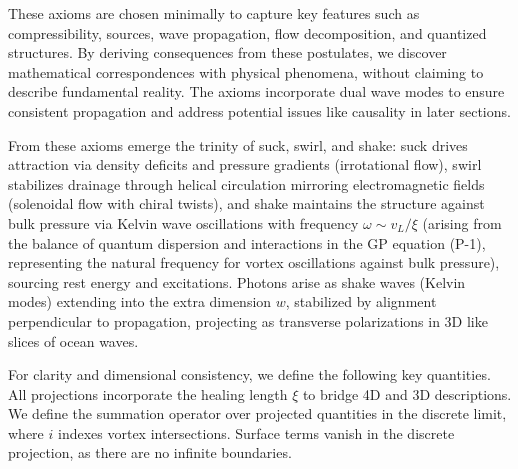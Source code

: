 These axioms are chosen minimally to capture key features such as compressibility, sources, wave propagation, flow decomposition, and quantized structures. By deriving consequences from these postulates, we discover mathematical correspondences with physical phenomena, without claiming to describe fundamental reality. The axioms incorporate dual wave modes to ensure consistent propagation and address potential issues like causality in later sections.

From these axioms emerge the trinity of suck, swirl, and shake: suck drives attraction via density deficits and pressure gradients (irrotational flow), swirl stabilizes drainage through helical circulation mirroring electromagnetic fields (solenoidal flow with chiral twists), and shake maintains the structure against bulk pressure via Kelvin wave oscillations with frequency $\omega \sim v_L / \xi$ (arising from the balance of quantum dispersion and interactions in the GP equation (P-1), representing the natural frequency for vortex oscillations against bulk pressure), sourcing rest energy and excitations. Photons arise as shake waves (Kelvin modes) extending into the extra dimension $w$, stabilized by alignment perpendicular to propagation, projecting as transverse polarizations in 3D like slices of ocean waves.

For clarity and dimensional consistency, we define the following key quantities. All projections incorporate the healing length $\xi$ to bridge 4D and 3D descriptions. We define the summation operator over projected quantities in the discrete limit, where $i$ indexes vortex intersections. Surface terms vanish in the discrete projection, as there are no infinite boundaries.

